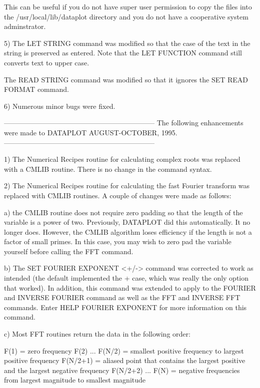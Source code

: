 {    This can be useful if you do not have super user permission to
    copy the files into the /usr/local/lib/dataplot directory and
    you do not have a cooperative system adminstrator.

 5) The LET STRING command was modified so that the case of the
    text in the string is preserved as entered.  Note that the
    LET FUNCTION command still converts text to upper case.

    The READ STRING command was modified so that it ignores the
    SET READ FORMAT command.

 6) Numerous minor bugs were fixed.

-----------------------------------------------------------------
The following enhancements were made to DATAPLOT AUGUST-OCTOBER, 1995.
-----------------------------------------------------------------

1) The Numerical Recipes routine for calculating complex roots
   was replaced with a CMLIB routine.  There is no change in the
   command syntax.

2) The Numerical Recipes routine for calculating the fast Fourier
   transform was replaced with CMLIB routines.  A couple of changes
   were made as follows:

   a) the CMLIB routine does not require zero padding so that
      the length of the variable is a power of two.  Previously,
      DATAPLOT did this automatically.  It no longer does.  However,
      the CMLIB algorithm loses efficiency if the length is not a
      factor of small primes.  In this case, you may wish to zero
      pad the variable yourself before calling the FFT command.

   b) The SET FOURIER EXPONENT <+/-> command was corrected to work
      as intended (the default implemented the + case, which was really
      the only option that worked).  In addition, this command was
      extended to apply to the FOURIER and INVERSE FOURIER command
      as well as the FFT and INVERSE FFT commands.  Enter
      HELP FOURIER EXPONENT for more information on this command.

   c) Most FFT routines return the data in the following order:

         F(1)              = zero frequency
         F(2) ... F(N/2)   = smallest positive frequency to largest
                             positive frequency
         F(N/2+1)          = aliased point that contains the largest
                             positive and the largest negative frequency
         F(N/2+2) ... F(N) = negative frequencies from largest
                             magnitude to smallest magnitude

}
